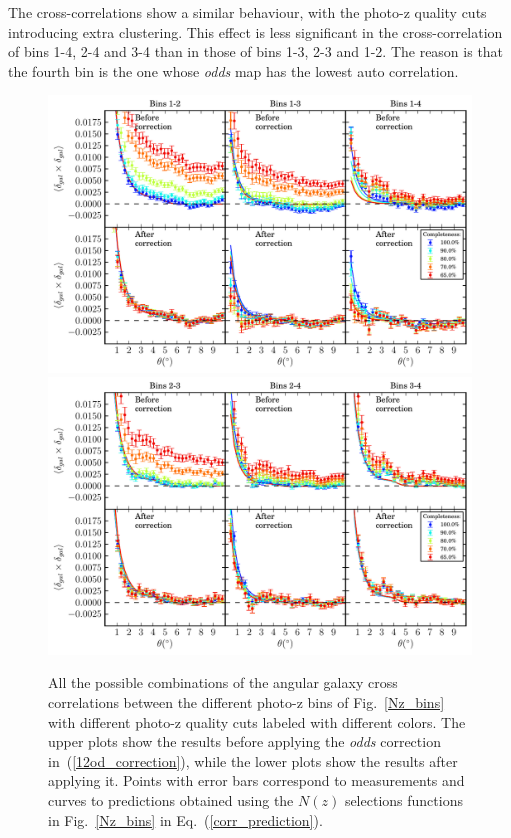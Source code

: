The cross-correlations show a similar behaviour, with the photo-z quality cuts introducing extra clustering. This effect is less significant in the cross-correlation of bins 1-4, 2-4 and 3-4 than in those of bins 1-3, 2-3 and 1-2. The reason is that the fourth bin is the one whose {\it odds} map has the lowest auto correlation.
\begin{figure}
\centering
\includegraphics[width=140mm]{./plots/cross_odcorr_plot_1.pdf} \\
\includegraphics[width=140mm]{./plots/cross_odcorr_plot_2.pdf}
\caption{All the possible combinations of the angular galaxy cross correlations between the different photo-z bins of Fig.~\ref{Nz_bins} with different photo-z quality cuts labeled with different colors. The upper plots show the results before applying the \textit{odds} correction in~(\ref{12od_correction}), while the lower plots show the results after applying it. Points with error bars correspond to measurements and curves to predictions obtained using the $N(z)$ selections functions in Fig.~\ref{Nz_bins} in Eq.~(\ref{corr_prediction}).}
\label{cross_odcorr}
\end{figure}
